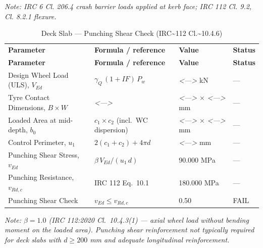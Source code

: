 \documentclass[12pt,a4paper]{report}
\numberwithin{figure}{chapter}
\newcommand{\placeholder}[1]{\textit{\textless #1\textgreater}}
\begin{document}
\noindent\textit{Note: IRC 6 Cl. 206.4 crash barrier loads applied at kerb face; IRC 112 Cl. 9.2, Cl. 8.2.1 flexure.}

\vspace{1em}
\begin{longtable}{|L{4.85cm}|C{3.09cm}|C{3.97cm}|C{1.77cm}|}
\caption{Deck Slab --- Punching Shear Check (IRC\textasciitilde{}112 Cl.\textasciitilde{}10.4.6)}\\
\hline
\textbf{Parameter} & \textbf{Formula / reference} & \textbf{Value} & \textbf{Status} \\
\hline
\endfirsthead
\hline
\textbf{Parameter} & \textbf{Formula / reference} & \textbf{Value} & \textbf{Status} \\
\hline
\endhead

Design Wheel Load (ULS), $V_{Ed}$ & $\gamma_Q\,(1+IF)\,P_w$ & \placeholder{---} kN & --- \\[6pt]
\hline
Tyre Contact Dimensions, $B \times W$ & \placeholder{---} & \placeholder{---} $\times$ \placeholder{---} mm & --- \\[6pt]
\hline
Loaded Area at mid-depth, $b_0$ & $c_1 \times c_2$ (incl.\ WC dispersion) & \placeholder{---} $\times$ \placeholder{---} mm & --- \\[6pt]
\hline
Control Perimeter, $u_1$ & $2(c_1+c_2) + 4\pi d$ & \placeholder{---} mm & --- \\[6pt]
\hline
Punching Shear Stress, $v_{Ed}$ & $\beta\,V_{Ed} / (u_1\,d)$ & 90.000 MPa & --- \\[6pt]
\hline
Punching Resistance, $v_{Rd,c}$ & IRC 112 Eq.\ 10.1 & 180.000 MPa & --- \\[6pt]
\hline
Punching Shear Check & $v_{Ed} \leq v_{Rd,c}$ & 0.50 & FAIL \\[6pt]
\hline

\end{longtable}
\noindent\textit{Note: $\beta = 1.0$ (IRC 112:2020 Cl.~10.4.3(1) --- axial wheel load without bending moment on the loaded area). Punching shear reinforcement not typically required for deck slabs with $d \geq 200$ mm and adequate longitudinal reinforcement.}
\end{document}
